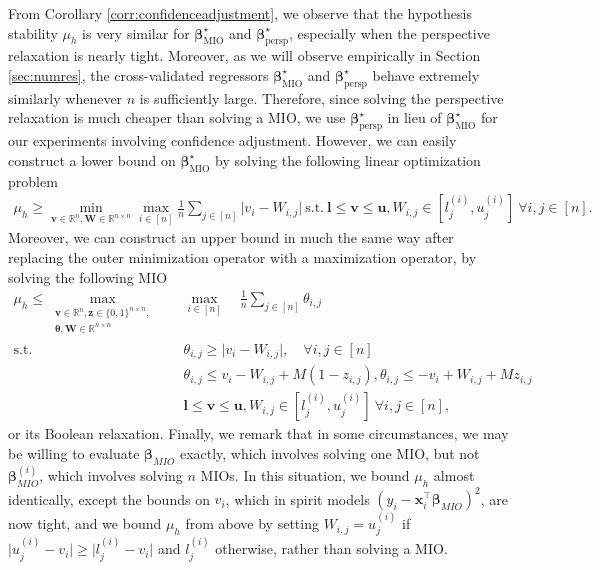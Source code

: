 \documentclass[ijoc,noblindrev]{informs3} %
\begin{document}
From Corollary \ref{corr:confidenceadjustment}, we observe that the hypothesis stability $\mu_h$ is very similar for $\bm{\beta}^\star_{\text{MIO}}$ and $\bm{\beta}^\star_{\text{persp}}$, especially when the perspective relaxation is nearly tight. Moreover, as we will observe empirically in Section \ref{sec:numres}, the cross-validated regressors $\bm{\beta}^\star_{\text{MIO}}$ and $\bm{\beta}^\star_{\text{persp}}$ behave extremely similarly whenever $n$ is sufficiently large. Therefore, since solving the perspective relaxation is much cheaper than solving a MIO, we use $\bm{\beta}^\star_{\text{persp}}$ in lieu of $\bm{\beta}^\star_{\text{MIO}}$ for our experiments involving confidence adjustment. However, we can easily construct a lower bound on $\bm{\beta}^\star_{\text{MIO}}$ by solving the following linear optimization problem{\color{black}
\begin{align*}
    \mu_h \geq \min_{\bm{v} \in \mathbb{R}^n, \bm{W} \in \mathbb{R}^{n \times n}}\max_{i \in [n]} \frac{1}{n} \sum_{j \in [n]}\vert v_i-W_{i,j}\vert \ \text{s.t.} \ \bm{l} \leq \bm{v} \leq \bm{u}, W_{i,j} \in [l_j^{(i)}, u_j^{(i)}] \ \forall i,j \in [n].
\end{align*}}
Moreover, we can construct an upper bound in much the same way after replacing the outer minimization operator with a maximization operator, by solving the following MIO{\color{black}
\begin{align*}
    \mu_h \leq \max_{\substack{\bm{v} \in \mathbb{R}^n, \bm{z} \in \{0, 1\}^{n\times n},\\ \bm{\theta}, \bm{W} \in \mathbb{R}^{n \times n}}} \quad & \max_{i \in [n]} \quad \frac{1}{n} \sum_{j \in [n]}\theta_{i,j} \\
    \text{s.t.} \ \ \ \quad\quad & \theta_{i,j} \geq \vert v_i-W_{i,j}\vert, \quad \forall i,j \in [n]\\
    & \theta_{i,j} \leq v_i-W_{i,j}+M (1-z_{i,j}), \theta_{i,j} \leq -v_i+W_{i,j}+M z_{i,j}\\
    & \bm{l} \leq \bm{v} \leq \bm{u}, W_{i,j} \in [l_j^{(i)}, u_j^{(i)}] \ \forall i,j \in [n],
\end{align*}}
or its Boolean relaxation. Finally, we remark that in some circumstances, we may be willing to evaluate $\bm{\beta}_{MIO}$ exactly, which involves solving one MIO, but not $\bm{\beta}^{(i)}_{MIO}$, which involves solving $n$ MIOs. In this situation, we bound $\mu_h$ almost identically, except the bounds on {\color{black}$v_i$}, which in spirit models $(y_i-\bm{x}_i^\top \bm{\beta}_{MIO})^2$, are now tight, and we bound $\mu_h$ from above by setting {\color{black}$W_{i,j}=u_j^{(i)}$} if {\color{black}$\vert u_j^{(i)}-v_i\vert \geq \vert l_j^{(i)}-v_i\vert$} and $l_j^{(i)}$ otherwise, rather than solving a MIO.
\fi
\end{document}
